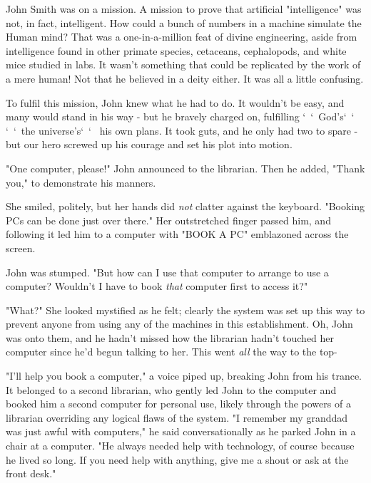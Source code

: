 John Smith was on a mission. A mission to prove that artificial "intelligence" was not, in fact, intelligent. How could a bunch of numbers in a machine simulate the Human mind? That was a one-in-a-million feat of divine engineering, aside from intelligence found in other primate species, cetaceans, cephalopods, and white mice studied in labs. It wasn't something that could be replicated by the work of a mere human! Not that he believed in a deity either. It was all a little confusing. 

 

To fulfil this mission, John knew what he had to do. It wouldn't be easy, and many would stand in his way - but he bravely charged on, fulfilling \char`~\char`~God's\char`~\char`~ \text{ } \char`~\char`~the universe's\char`~\char`~ \text{ }his own plans. It took guts, and he only had two to spare - but our hero screwed up his courage and set his plot into motion.

 

"One computer, please!" John announced to the librarian. Then he added, "Thank you," to demonstrate his manners. 

 

She smiled, politely, but her hands did \textit{not} clatter against the keyboard. "Booking PCs can be done just over there." Her outstretched finger passed him, and following it led him to a computer with "BOOK A PC" emblazoned across the screen. 

 

John was stumped. "But how can I use that computer to arrange to use a computer? Wouldn't I have to book \textit{that} computer first to access it?" 

 

"What?" She looked mystified as he felt; clearly the system was set up this way to prevent anyone from using any of the machines in this establishment. Oh, John was onto them, and he hadn't missed how the librarian hadn't touched her computer since he'd begun talking to her. This went \textit{all} the way to the top- 

 

"I'll help you book a computer," a voice piped up, breaking John from his trance. It belonged to a second librarian, who gently led John to the computer and booked him a second computer for personal use, likely through the powers of a librarian overriding any logical flaws of the system. "I remember my granddad was just awful with computers," he said conversationally as he parked John in a chair at a computer. "He always needed help with technology, of course because he lived so long. If you need help with anything, give me a shout or ask at the front desk." 

